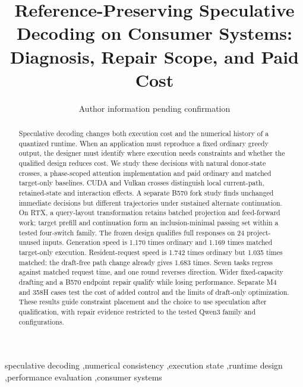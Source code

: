 \documentclass[final,5p,times,twocolumn]{elsarticle}
\begin{document}
\begin{frontmatter}
\title{Reference-Preserving Speculative Decoding on Consumer Systems: Diagnosis, Repair Scope, and Paid Cost}
\author{Author information pending confirmation}
\begin{abstract}
Speculative decoding changes both execution cost and the numerical history of a quantized runtime. When an application must reproduce a fixed ordinary greedy output, the designer must identify where execution needs constraints and whether the qualified design reduces cost. We study these decisions with natural donor-state crosses, a phase-scoped attention implementation and paid ordinary and matched target-only baselines. CUDA and Vulkan crosses distinguish local current-path, retained-state and interaction effects. A separate B570 fork study finds unchanged immediate decisions but different trajectories under sustained alternate continuation. On RTX, a query-layout transformation retains batched projection and feed-forward work; target prefill and continuation form an inclusion-minimal passing set within a tested four-switch family. The frozen design qualifies full responses on 24 project-unused inputs. Generation speed is 1.170 times ordinary and 1.169 times matched target-only execution. Resident-request speed is 1.742 times ordinary but 1.035 times matched: the draft-free path change already gives 1.683 times. Seven tasks regress against matched request time, and one round reverses direction. Wider fixed-capacity drafting and a B570 endpoint repair qualify while losing performance. Separate M4 and 358H cases test the cost of added control and the limits of draft-only optimization. These results guide constraint placement and the choice to use speculation after qualification, with repair evidence restricted to the tested Qwen3 family and configurations.
\end{abstract}
\begin{keyword}
speculative decoding \sep numerical consistency \sep execution state \sep runtime design \sep performance evaluation \sep consumer systems
\end{keyword}
\end{frontmatter}











\end{document}
